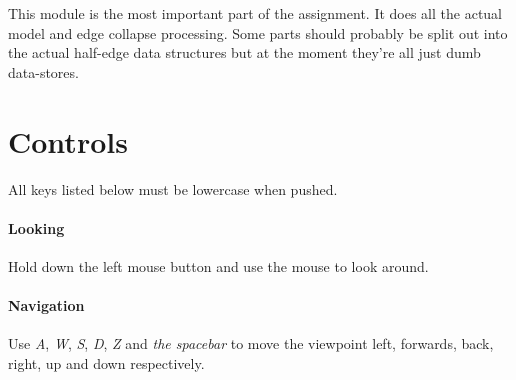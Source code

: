       This module is the most important part of the assignment.  It does all the
      actual model and edge collapse processing.  Some parts should probably be
      split out into the actual half-edge data structures but at the moment
      they're all just dumb data-stores.

  \vspace{-15pt}
  \section{Controls}
    
    All keys listed below must be lowercase when pushed.
    
    \vspace{-15pt}
    \paragraph{Looking}
      
      Hold down the left mouse button and use the mouse to look around.

    \vspace{-15pt}
    \paragraph{Navigation}

      Use \emph{A}, \emph{W}, \emph{S}, \emph{D}, \emph{Z} and \emph{the
      spacebar} to move the viewpoint left, forwards, back, right, up and down
      respectively.

    \vspace{-15pt}
